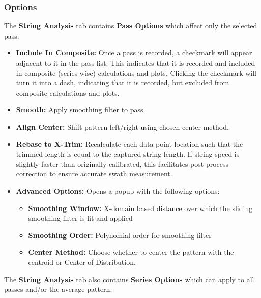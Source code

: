 \documentclass[10pt,letterpaper,titlepage]{article}
\begin{document}
    \subsubsection{Options}
    \label{sec:string_options}
    The \textbf{String Analysis} tab contains \textbf{Pass Options} which affect only the selected pass:
    \begin{itemize}
        \item \textbf{Include In Composite:} Once a pass is recorded, a checkmark will appear adjacent to it in the pass list. This indicates that it is recorded and included in composite (series-wise) calculations and plots. Clicking the checkmark will turn it into a dash, indicating that it is recorded, but excluded from composite calculations and plots.
        \item \textbf{Smooth:} Apply smoothing filter to pass
        \item \textbf{Align Center:} Shift pattern left/right using chosen center method.
        \item \textbf{Rebase to X-Trim:} Recalculate each data point location such that the trimmed length is equal to the captured string length. If string speed is slightly faster than originally calibrated, this facilitates post-process correction to ensure accurate swath measurement.
        \item \textbf{Advanced Options:} Opens a popup with the following options:
        \begin{itemize}
            \item \textbf{Smoothing Window:} X-domain based distance over which the sliding smoothing filter is fit and applied
            \item \textbf{Smoothing Order:} Polynomial order for smoothing filter
            \item \textbf{Center Method:} Choose whether to center the pattern with the centroid or Center of Distribution.
        \end{itemize}
    \end{itemize}
    The \textbf{String Analysis} tab also contains \textbf{Series Options} which can apply to all passes and/or the average pattern:
\end{document}
